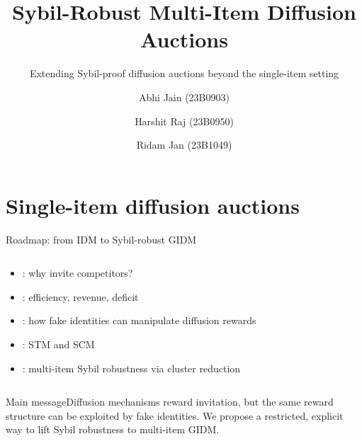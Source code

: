 \documentclass[10pt,aspectratio=169]{beamer}
\title[Sybil-Robust Multi-Item Diffusion Auctions]{Sybil-Robust Multi-Item Diffusion Auctions}
\subtitle{Extending Sybil-proof diffusion auctions beyond the single-item setting}
\author[Abhi Jain, Harshit Raj, Ridam Jan]{Abhi Jain (23B0903) \and Harshit Raj (23B0950) \and Ridam Jan (23B1049)}
\newcommand{\greenblock}[2]{\begin{exampleblock}{#1}#2\end{exampleblock}}
\newcommand{\impterm}[1]{\textbf{\color{purple}{#1}}}
\begin{document}
\maketitle

\section{Single-item diffusion auctions}

\begin{frame}{Roadmap: from IDM to Sybil-robust GIDM}
\begin{columns}[T,totalwidth=\textwidth]
\begin{column}{0.54\textwidth}
\begin{itemize}
    \item \impterm{Single-item diffusion auctions}: why invite competitors?
    \item \impterm{VCG vs IDM}: efficiency, revenue, deficit
    \item \impterm{Sybil attack exploits}: how fake identities can manipulate diffusion rewards
    \item \impterm{Single-item SP mechanisms}: STM and SCM
    \item \impterm{Our direction}: multi-item Sybil robustness via cluster reduction
\end{itemize}
\end{column}
\begin{column}{0.43\textwidth}
\centering
{}
\end{column}
\end{columns}
\vspace{1mm}
\greenblock{Main message}{Diffusion mechanisms reward invitation, but the same reward structure can be exploited by fake identities. We propose a restricted, explicit way to lift Sybil robustness to multi-item GIDM.}
\end{frame}
\end{document}
